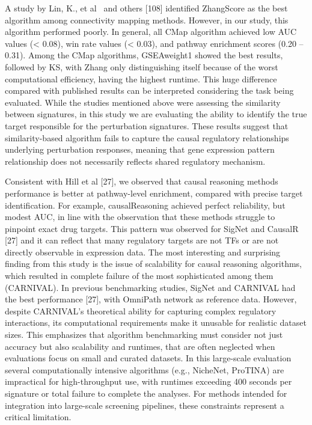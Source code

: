 A study by Lin, K., et al~\cite{RN79} and others [108] identified ZhangScore as the best algorithm among connectivity mapping methods. However, in our study, this algorithm performed poorly. In general, all CMap algorithm achieved low AUC values (< 0.08), win rate values (< 0.03), and pathway enrichment scores (0.20 – 0.31). Among the CMap algorithms, GSEAweight1 showed the best results, followed by KS, with Zhang only distinguishing itself because of the worst computational efficiency, having the highest runtime. This huge difference compared with published results can be interpreted considering the task being evaluated. While the studies mentioned above were assessing the similarity between signatures, in this study we are evaluating the ability to identify the true target responsible for the perturbation signatures. These results suggest that similarity-based algorithm fails to capture the causal regulatory relationships underlying perturbation responses, meaning that gene expression pattern relationship does not necessarily reflects shared regulatory mechanism.

Consistent with Hill et al [27], we observed that causal reasoning methods performance is better at pathway-level enrichment, compared with precise target identification. For example, causalReasoning achieved perfect reliability, but modest AUC, in line with the observation that these methods struggle to pinpoint exact drug targets. This pattern was observed for SigNet and CausalR [27] and it can reflect that many regulatory targets are not TFs or are not directly observable in expression data. The most interesting and surprising finding from this study is the issue of scalability for causal reasoning algorithms, which resulted in complete failure of the most sophisticated among them (CARNIVAL). In previous benchmarking studies, SigNet and CARNIVAL had the best performance [27], with OmniPath network as reference data. However, despite CARNIVAL's theoretical ability for capturing complex regulatory interactions, its computational requirements make it unusable for realistic dataset sizes. This emphasizes that algorithm benchmarking must consider not just accuracy but also scalability and runtimes, that are often neglected when evaluations focus on small and curated datasets. In this large-scale evaluation several computationally intensive algorithms (e.g., NicheNet, ProTINA) are impractical for high-throughput use, with runtimes exceeding 400 seconds per signature or total failure to complete the analyses. For methods intended for integration into large-scale screening pipelines, these constraints represent a critical limitation.

